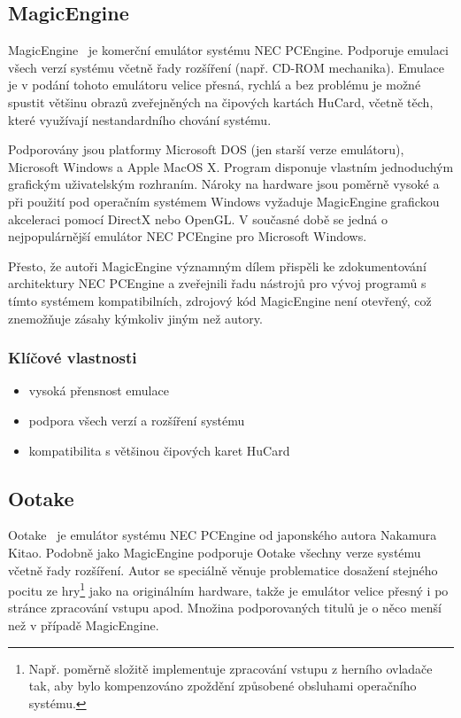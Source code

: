 
\subsection{MagicEngine}

MagicEngine~\cite{wwwMagicEngine} je komerční emulátor systému NEC PCEngine.
Podporuje emulaci všech verzí systému včetně řady rozšíření (např. CD-ROM
mechanika). Emulace je v podání tohoto emulátoru velice přesná, rychlá a bez
problému je možné spustit většinu obrazů zveřejněných na čipových kartách
HuCard, včetně těch, které využívají nestandardního chování systému.

Podporovány jsou platformy Microsoft DOS (jen starší verze emulátoru),
Microsoft Windows a Apple MacOS X. Program disponuje vlastním jednoduchým
grafickým uživatelským rozhraním. Nároky na hardware jsou poměrně vysoké a při
použití pod operačním systémem Windows vyžaduje MagicEngine grafickou
akceleraci pomocí DirectX nebo OpenGL. V současné době se jedná o
nejpopulárnější emulátor NEC PCEngine pro Microsoft Windows.

Přesto, že autoři MagicEngine významným dílem přispěli ke zdokumentování
architektury NEC PCEngine a zveřejnili řadu nástrojů pro vývoj programů s tímto
systémem kompatibilních, zdrojový kód MagicEngine není otevřený, což znemožňuje
zásahy kýmkoliv jiným než autory.

\subsubsection*{Klíčové vlastnosti}

\begin{itemize}
\item vysoká přensnost emulace
\item podpora všech verzí a rozšíření systému
\item kompatibilita s většinou čipových karet HuCard
\end{itemize}


\subsection{Ootake}

Ootake~\cite{wwwOotake} je emulátor systému NEC PCEngine od japonského autora
Nakamura Kitao. Podobně jako MagicEngine podporuje Ootake všechny verze systému
včetně řady rozšíření. Autor se speciálně věnuje problematice dosažení stejného
pocitu ze hry\footnote{Např. poměrně složitě implementuje zpracování vstupu
z herního ovladače tak, aby bylo kompenzováno zpoždění způsobené obsluhami
operačního systému.} jako na originálním hardware, takže je emulátor velice
přesný i po stránce zpracování vstupu apod. Množina podporovaných titulů je o
něco menší než v případě MagicEngine.

